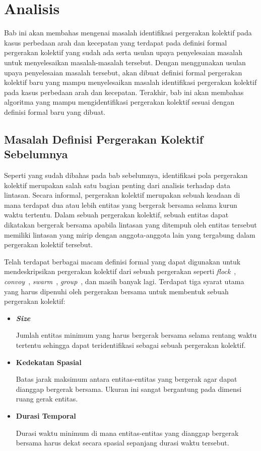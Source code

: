 \chapter{Analisis}
\label{chap:analisis}

Bab ini akan membahas mengenai masalah identifikasi pergerakan kolektif pada kasus perbedaan arah dan kecepatan yang terdapat pada definisi formal pergerakan kolektif yang sudah ada serta usulan upaya penyelesaian masalah untuk menyelesaikan masalah-masalah tersebut. Dengan menggunakan usulan upaya penyelesaian masalah tersebut, akan dibuat definisi formal pergerakan kolektif baru yang mampu menyelesaikan masalah identifikasi pergerakan kolektif pada kasus perbedaan arah dan kecepatan. Terakhir, bab ini akan membahas algoritma yang mampu mengidentifikasi pergerakan kolektif sesuai dengan definisi formal baru yang dibuat.

\section{Masalah Definisi Pergerakan Kolektif Sebelumnya}
\label{sec:masalah-definisi-sebelumnya}

Seperti yang sudah dibahas pada bab sebelumnya, identifikasi pola pergerakan kolektif merupakan salah satu bagian penting dari analisis terhadap data lintasan. Secara informal, pergerakan kolektif merupakan sebuah keadaan di mana terdapat dua atau lebih entitas yang bergerak bersama selama kurun waktu tertentu. Dalam sebuah pergerakan kolektif, sebuah entitas dapat dikatakan bergerak bersama apabila lintasan yang ditempuh oleh entitas tersebut memiliki lintasan yang mirip dengan anggota-anggota lain yang tergabung dalam pergerakan kolektif tersebut.

Telah terdapat berbagai macam definisi formal yang dapat digunakan untuk mendeskripsikan pergerakan kolektif dari sebuah pergerakan seperti \textit{flock}~\cite{cao:flock, gudmundsson:flock}, \textit{convoy}~\cite{jeung:convoys}, \textit{swarm}~\cite{li:swarm}, \textit{group}~\cite{buchin:group, yida:group}, dan masih banyak lagi. Terdapat tiga syarat utama yang harus dipenuhi oleh pergerakan bersama untuk membentuk sebuah pergerakan kolektif:

\begin{itemize}
    \item \textbf{\textit{Size}}
    
    Jumlah entitas minimum yang harus bergerak bersama selama rentang waktu tertentu sehingga dapat teridentifikasi sebagai sebuah pergerakan kolektif.
    
    \item \textbf{Kedekatan Spasial}
    
    Batas jarak maksimum antara entitas-entitas yang bergerak agar dapat dianggap bergerak bersama. Ukuran ini sangat bergantung pada dimensi ruang gerak entitas.
    
    \item \textbf{Durasi Temporal}
    
    Durasi waktu minimum di mana entitas-entitas yang dianggap bergerak bersama harus dekat secara spasial sepanjang durasi waktu tersebut. 
\end{itemize}

